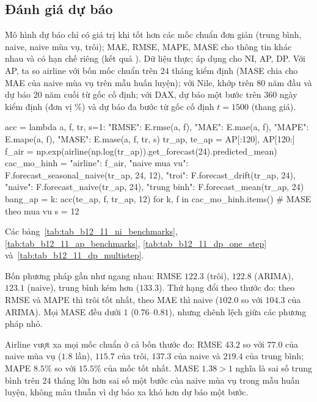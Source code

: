 \subsection{Đánh giá dự báo}

 Mô hình dự báo chỉ có giá trị khi tốt hơn các mốc chuẩn đơn giản (trung bình, naive, naive mùa vụ, trôi); MAE, RMSE, MAPE, MASE cho thông tin khác nhau và có hạn chế riêng (kết quả ).
 Dữ liệu thực; áp dụng cho NI, AP, DP. Với AP, ta so airline với bốn mốc chuẩn trên $24$ tháng kiểm định (MASE chia cho MAE của naive mùa vụ trên mẫu huấn luyện); với Nile, khớp trên 80 năm đầu và dự báo 20 năm cuối từ gốc cố định; với DAX, dự báo một bước trên $360$ ngày kiểm định (đơn vị \%) và dự báo đa bước từ gốc cố định $t=1500$ (thang giá).
\begin{codeblock}
acc = lambda a, f, tr, s=1: {"RMSE": E.rmse(a, f), "MAE": E.mae(a, f),
                              "MAPE": E.mape(a, f), "MASE": E.mase(a, f, tr, s)}
tr_ap, te_ap = AP[:120], AP[120:]
f_air = np.exp(airline(np.log(tr_ap)).get_forecast(24).predicted_mean)
cac_mo_hinh = {"airline": f_air, "naive mua vu": F.forecast_seasonal_naive(tr_ap, 24, 12),
               "troi": F.forecast_drift(tr_ap, 24), "naive": F.forecast_naive(tr_ap, 24),
               "trung binh": F.forecast_mean(tr_ap, 24)}
bang_ap = {k: acc(te_ap, f, tr_ap, 12) for k, f in cac_mo_hinh.items()}   # MASE theo mua vu s = 12
\end{codeblock}
 Các bảng~\ref{tab:tab_b12_11_ni_benchmarks}, \ref{tab:tab_b12_11_ap_benchmarks}, \ref{tab:tab_b12_11_dp_one_step} và~\ref{tab:tab_b12_11_dp_multistep}.




 Bốn phương pháp gần như ngang nhau: RMSE $122.3$ (trôi), $122.8$ (ARIMA), $123.1$ (naive), trung bình kém hơn ($133.3$). Thứ hạng đổi theo thước đo: theo RMSE và MAPE thì trôi tốt nhất, theo MAE thì naive ($102.0$ so với $104.3$ của ARIMA). Mọi MASE đều dưới $1$ ($0.76$--$0.81$), nhưng chênh lệch giữa các phương pháp nhỏ.

 Airline vượt xa mọi mốc chuẩn ở cả bốn thước đo: RMSE $43.2$ so với $77.0$ của naive mùa vụ ($1.8$ lần), $115.7$ của trôi, $137.3$ của naive và $219.4$ của trung bình; MAPE $8.5\%$ so với $15.5\%$ của mốc tốt nhất. MASE $1.38>1$ nghĩa là sai số trung bình trên $24$ tháng lớn hơn sai số một bước của naive mùa vụ trong mẫu huấn luyện, không mâu thuẫn vì dự báo xa khó hơn dự báo một bước.


